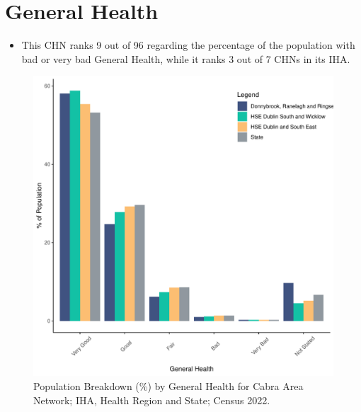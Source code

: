 \documentclass{article}
\begin{document}
\pagebreak

\section{General Health}\label{sect:GenHealth}
\begin{itemize}
\item  This CHN ranks  9 out of 96 regarding the percentage of the population with bad or very bad General Health, while it ranks   3 out of 7 CHNs in its IHA.
\end{itemize}
\begin{figure}[h]
	\centering
	\includegraphics[width = 150mm]{../figures/GenED.pdf}
	\caption{Population Breakdown (\%) by General Health for Cabra Area Network; IHA, Health Region and State;  Census 2022.}
	\label{fig:2ae19629-1a6a-13a3-e055-000000000001}
	\end{figure}
\end{document}
